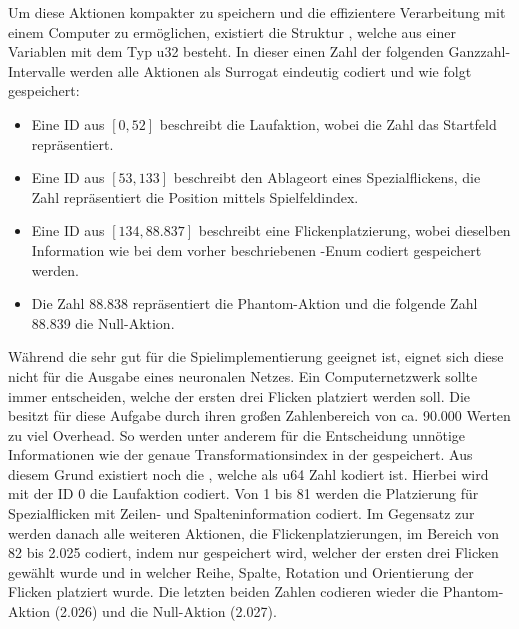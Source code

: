 

Um diese Aktionen kompakter zu speichern und die effizientere Verarbeitung mit einem Computer zu ermöglichen, existiert die Struktur , welche aus einer Variablen mit dem Typ \ac{u32} besteht. In dieser einen Zahl der folgenden Ganzzahl-Intervalle werden alle Aktionen als Surrogat eindeutig codiert und wie folgt gespeichert:

\begin{itemize}
    \item Eine \ac{ID} aus $[0, 52]$ beschreibt die Laufaktion, wobei die Zahl das Startfeld repräsentiert.
    \item Eine \ac{ID} aus $[53, 133]$ beschreibt den Ablageort eines Spezialflickens, die Zahl repräsentiert die Position mittels Spielfeldindex.
    \item Eine \ac{ID} aus $[134, 88.837]$ beschreibt eine Flickenplatzierung, wobei dieselben Information wie bei dem vorher beschriebenen -Enum codiert gespeichert werden.
    \item Die Zahl 88.838 repräsentiert die Phantom-Aktion und die folgende Zahl 88.839 die Null-Aktion.
\end{itemize}

Während die \hyperref[text:action-id]{} sehr gut für die Spielimplementierung geeignet ist, eignet sich diese nicht für die Ausgabe eines neuronalen Netzes. Ein Computernetzwerk sollte immer entscheiden, welche der ersten drei Flicken platziert werden soll. Die \hyperref[text:action-id]{} besitzt für diese Aufgabe durch ihren großen Zahlenbereich von ca. 90.000 Werten zu viel Overhead. So werden unter anderem für die Entscheidung unnötige Informationen wie der genaue Transformationsindex in der \hyperref[text:action-id]{} gespeichert. Aus diesem Grund existiert noch die , welche als \ac{u64} Zahl kodiert ist. Hierbei wird mit der \ac{ID} 0 die Laufaktion codiert. Von 1 bis 81 werden die Platzierung für Spezialflicken mit Zeilen- und Spalteninformation codiert. Im Gegensatz zur \hyperref[text:action-id]{} werden danach alle weiteren Aktionen, die Flickenplatzierungen, im Bereich von 82 bis 2.025 codiert, indem nur gespeichert wird, welcher der ersten drei Flicken gewählt wurde und in welcher Reihe, Spalte, Rotation und Orientierung der Flicken platziert wurde. Die letzten beiden Zahlen codieren wieder die Phantom-Aktion (2.026) und die Null-Aktion (2.027).

